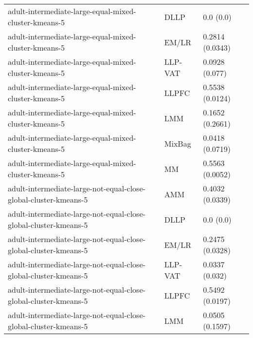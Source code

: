 \begin{longtable}{lll}
                                                        adult-intermediate-large-equal-mixed-cluster-kmeans-5 &      DLLP &                             0.0 (0.0) \\
                                                        adult-intermediate-large-equal-mixed-cluster-kmeans-5 &     EM/LR &                       0.2814 (0.0343) \\
                                                        adult-intermediate-large-equal-mixed-cluster-kmeans-5 &   LLP-VAT &                        0.0928 (0.077) \\
                                                        adult-intermediate-large-equal-mixed-cluster-kmeans-5 &     LLPFC &                       0.5538 (0.0124) \\
                                                        adult-intermediate-large-equal-mixed-cluster-kmeans-5 &       LMM &                       0.1652 (0.2661) \\
                                                        adult-intermediate-large-equal-mixed-cluster-kmeans-5 &    MixBag &                       0.0418 (0.0719) \\
                                                        adult-intermediate-large-equal-mixed-cluster-kmeans-5 &        MM &                       0.5563 (0.0052) \\
                                             adult-intermediate-large-not-equal-close-global-cluster-kmeans-5 &       AMM &                       0.4032 (0.0339) \\
                                             adult-intermediate-large-not-equal-close-global-cluster-kmeans-5 &      DLLP &                             0.0 (0.0) \\
                                             adult-intermediate-large-not-equal-close-global-cluster-kmeans-5 &     EM/LR &                       0.2475 (0.0328) \\
                                             adult-intermediate-large-not-equal-close-global-cluster-kmeans-5 &   LLP-VAT &                        0.0337 (0.032) \\
                                             adult-intermediate-large-not-equal-close-global-cluster-kmeans-5 &     LLPFC &                       0.5492 (0.0197) \\
                                             adult-intermediate-large-not-equal-close-global-cluster-kmeans-5 &       LMM &                       0.0505 (0.1597) \\

\end{longtable}
